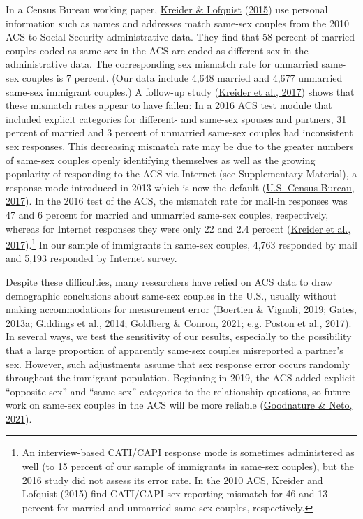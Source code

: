 \documentclass[
  11pt,
]{article}
\begin{document}
In a Census Bureau working paper, \protect\hyperlink{ref-kreider_2015}{Kreider \& Lofquist} (\protect\hyperlink{ref-kreider_2015}{2015}) use personal information such as names and addresses match same-sex couples from the 2010 ACS to Social Security administrative data. They find that 58 percent of married couples coded as same-sex in the ACS are coded as different-sex in the administrative data. The corresponding sex mismatch rate for unmarried same-sex couples is 7 percent. (Our data include 4,648 married and 4,677 unmarried same-sex immigrant couples.) A follow-up study (\protect\hyperlink{ref-kreider_2017}{Kreider et al., 2017}) shows that these mismatch rates appear to have fallen: In a 2016 ACS test module that included explicit categories for different- and same-sex spouses and partners, 31 percent of married and 3 percent of unmarried same-sex couples had inconsistent sex responses. This decreasing mismatch rate may be due to the greater numbers of same-sex couples openly identifying themselves as well as the growing popularity of responding to the ACS via Internet (see Supplementary Material), a response mode introduced in 2013 which is now the default (\protect\hyperlink{ref-u.s.censusbureau_2017}{U.S. Census Bureau, 2017}). In the 2016 test of the ACS, the mismatch rate for mail-in responses was 47 and 6 percent for married and unmarried same-sex couples, respectively, whereas for Internet responses they were only 22 and 2.4 percent (\protect\hyperlink{ref-kreider_2017}{Kreider et al., 2017}).\footnote{An interview-based CATI/CAPI response mode is sometimes administered as well (to 15 percent of our sample of immigrants in same-sex couples), but the 2016 study did not assess its error rate. In the 2010 ACS, Kreider and Lofquist (2015) find CATI/CAPI sex reporting mismatch for 46 and 13 percent for married and unmarried same-sex couples, respectively.} In our sample of immigrants in same-sex couples, 4,763 responded by mail and 5,193 responded by Internet survey.

Despite these difficulties, many researchers have relied on ACS data to draw demographic conclusions about same-sex couples in the U.S., usually without making accommodations for measurement error (\protect\hyperlink{ref-boertien_2019}{Boertien \& Vignoli, 2019}; \protect\hyperlink{ref-gates_2013}{Gates, 2013a}; \protect\hyperlink{ref-giddings_2014}{Giddings et al., 2014}; \protect\hyperlink{ref-goldberg_2021}{Goldberg \& Conron, 2021}; e.g. \protect\hyperlink{ref-poston_2017}{Poston et al., 2017}). In several ways, we test the sensitivity of our results, especially to the possibility that a large proportion of apparently same-sex couples misreported a partner's sex. However, such adjustments assume that sex response error occurs randomly throughout the immigrant population. Beginning in 2019, the ACS added explicit ``opposite-sex'' and ``same-sex'' categories to the relationship questions, so future work on same-sex couples in the ACS will be more reliable (\protect\hyperlink{ref-goodnature_2021}{Goodnature \& Neto, 2021}).
\end{document}
